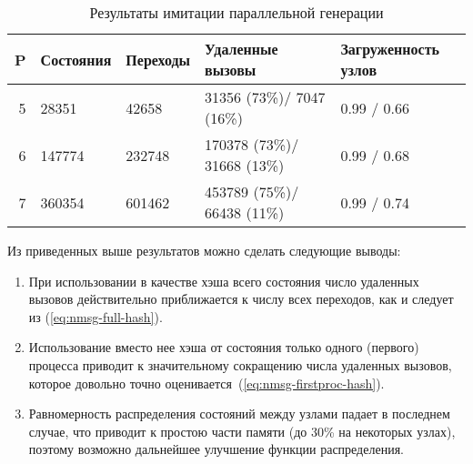 \begin{table}[ht]
  \centering
  \begin{tabular}[ht]{|r|l|l|l|p{}|}
    \hline
    P & Состояния & Переходы & Удаленные вызовы & Загруженность узлов    \\
    \hline
    5 & 28351     & 42658    & 31356  (73\%)/ 7047  (16\%) & 0.99 / 0.66 \\ 
    6 & 147774    & 232748   & 170378 (73\%)/ 31668 (13\%) & 0.99 / 0.68 \\ 
    7 & 360354    & 601462   & 453789 (75\%)/ 66438 (11\%) & 0.99 / 0.74 \\ 
    \hline
  \end{tabular}
  \caption{Результаты имитации параллельной генерации}
  \label{tab:paremu-stats}
\end{table}

Из приведенных выше результатов можно сделать следующие выводы:

\begin{enumerate}
\item При использовании в качестве  хэша всего состояния число
  удаленных вызовов действительно приближается к числу всех переходов, как и
  следует из (\ref{eq:nmsg-full-hash}).

\item Использование вместо нее хэша от состояния только одного (первого)
  процесса приводит к значительному сокращению числа удаленных
  вызовов, которое довольно точно оценивается~(\ref{eq:nmsg-firstproc-hash}).

\item Равномерность распределения состояний между узлами падает в последнем
  случае, что приводит к простою части памяти  (до 30\% на некоторых узлах),
  поэтому возможно дальнейшее улучшение функции распределения.
\end{enumerate}

